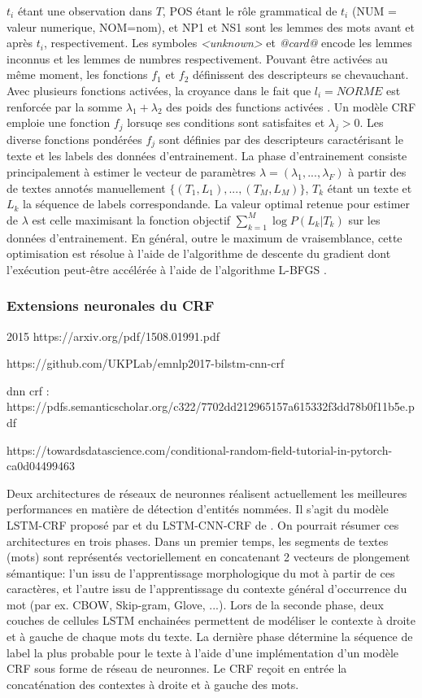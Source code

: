 $t_i$ étant une observation dans $T$, POS étant le rôle grammatical de $t_i$ (NUM = valeur numerique, NOM=nom), et NP1 et NS1 sont les lemmes des mots avant et après $t_i$, respectivement. Les symboles \textit{<unknown>} et \textit{@card@} encode les lemmes inconnus et les lemmes de numbres respectivement. Pouvant être activées au même moment, les fonctions $f_1$ et $f_2$ définissent des descripteurs se chevauchant. Avec plusieurs fonctions activées, la croyance dans le fait que $l_i = NORME$ est renforcée par la somme $\lambda_1 + \lambda_2$ des poids  des functions activées \citep{Zhu2010CRFlecture}.  Un modèle CRF emploie une fonction $f_j$ lorsuqe ses conditions sont satisfaites et $\lambda_j > 0$. Les diverse fonctions pondérées $f_j$ sont définies par des descripteurs caractérisant le texte et les labels des données d'entrainement. La phase d'entrainement consiste principalement à estimer le vecteur de paramètres $\lambda = (\lambda_1,...,\lambda_F)$ à partir des de textes annotés manuellement $ \lbrace (T_1, L_1), ..., (T_M, L_M) \rbrace $, $ T_k $ étant un texte et $ L_k $ la séquence de labels correspondande. La valeur optimal retenue pour estimer de $\lambda$ est celle maximisant la fonction objectif   
$\sum\limits_ {k = 1} ^ M \log P (L_k \vert T_k) $ sur les données d'entrainement. En général, outre le maximum de vraisemblance, cette optimisation est résolue à l'aide de l'algorithme de descente du gradient dont l'exécution peut-être accélérée à l'aide de l'algorithme L-BFGS \citep{liu1989l-bfgs}.

\subsubsection{Extensions neuronales du CRF}
2015 https://arxiv.org/pdf/1508.01991.pdf

https://github.com/UKPLab/emnlp2017-bilstm-cnn-crf

dnn crf : https://pdfs.semanticscholar.org/c322/7702dd212965157a615332f3dd78b0f11b5e.pdf

https://towardsdatascience.com/conditional-random-field-tutorial-in-pytorch-ca0d04499463

Deux architectures de réseaux de neuronnes réalisent actuellement les meilleures performances en matière de détection d'entités nommées. Il s'agit du modèle LSTM-CRF proposé par \citet{lample2016nnner} et du LSTM-CNN-CRF de \citet{ma2016lstm-cnns-crf}. On pourrait résumer ces architectures en trois phases. Dans un premier temps, les segments de textes (mots) sont représentés vectoriellement en concatenant 2 vecteurs de plongement sémantique: l'un issu de l'apprentissage morphologique du mot à partir de ces caractères, et l'autre issu de l'apprentissage du contexte général d'occurrence du mot (par ex. CBOW, Skip-gram, Glove, ...). Lors de la seconde phase, deux couches de cellules LSTM enchainées permettent de modéliser le contexte à droite et à gauche de chaque mots du texte. La dernière phase détermine la séquence de label la plus probable pour le texte à l'aide d'une implémentation d'un modèle CRF sous forme de réseau de neuronnes. Le CRF reçoit en entrée la concaténation des contextes à droite et à gauche des mots.

